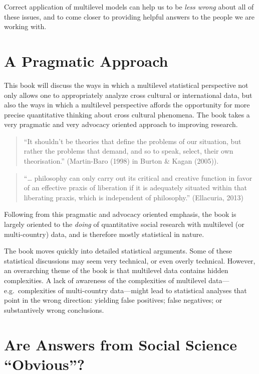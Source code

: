 \documentclass[
  letterpaper,
  DIV=11,
  numbers=noendperiod]{scrreprt}
\begin{document}
Correct application of multilevel models can help us to be \emph{less
wrong} about all of these issues, and to come closer to providing
helpful answers to the people we are working with. 

\section{A Pragmatic Approach}\label{a-pragmatic-approach}

This book will discuss the ways in which a multilevel statistical
perspective not only allows one to appropriately analyze cross cultural
or international data, but also the ways in which a multilevel
perspective affords the opportunity for more precise quantitative
thinking about cross cultural phenomena. The book takes a very pragmatic
and very advocacy oriented approach to improving research.
 

\begin{quote}
``It shouldn't be theories that define the problems of our situation,
but rather the problems that demand, and so to speak, select, their own
theorisation.'' (Martin-Baro (1998) in Burton \& Kagan (2005)).
\end{quote}

\begin{quote}
``\ldots{} philosophy can only carry out its critical and creative
function in favor of an effective praxis of liberation if it is
adequately situated within that liberating praxis, which is independent
of philosophy.'' (Ellacuria, 2013) 
\end{quote}

Following from this pragmatic and advocacy oriented emphasis, the book
is largely oriented to the \emph{doing} of quantitative social research
with multilevel (or multi-country) data, and is therefore mostly
statistical in nature.

The book moves quickly into detailed statistical arguments. Some of
these statistical discussions may seem very technical, or even overly
technical. However, an overarching theme of the book is that multilevel
data contains hidden complexities. A lack of awareness of the
complexities of multilevel data---e.g.~complexities of multi-country
data---might lead to statistical analyses that point in the wrong
direction: yielding false positives; false negatives; or substantively
wrong conclusions.

\section{Are Answers from Social Science
``Obvious''?}\label{sec-obvious}
\end{document}
